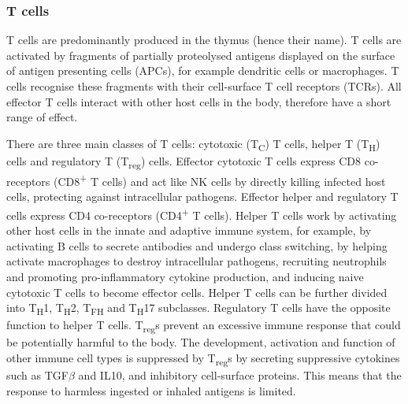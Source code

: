 \subsubsection{T cells}
T cells are predominantly produced in the thymus (hence their name).
T cells are activated by fragments of partially proteolysed antigens displayed on the surface of antigen presenting cells (APCs), for example dendritic cells or macrophages.
T cells recognise these fragments with their cell-surface T cell receptors (TCRs)\@.
All effector T cells interact with other host cells in the body, therefore have a short range of effect.

There are three main classes of T cells: cytotoxic (T\textsubscript{C}) T cells, helper T (T\textsubscript{H}) cells and regulatory T (T\textsubscript{reg}) cells.
Effector cytotoxic T cells express CD8 co-receptors (CD8\textsuperscript{+} T cells) and act like NK cells by directly killing infected host cells, protecting against intracellular pathogens.
Effector helper and regulatory T cells express CD4 co-receptors (CD4\textsuperscript{+} T cells).
Helper T cells work by activating other host cells in the innate and adaptive immune system, for example, by activating B cells to secrete antibodies and undergo class switching, by helping activate macrophages to destroy intracellular pathogens, recruiting neutrophils and promoting pro-inflammatory cytokine production, and inducing naive cytotoxic T cells to become effector cells.
Helper T cells can be further divided into T\textsubscript{H}1, T\textsubscript{H}2, T\textsubscript{FH} and T\textsubscript{H}17 subclasses.
Regulatory T cells have the opposite function to helper T cells.
T\textsubscript{reg}s prevent an excessive immune response that could be potentially harmful to the body.
The development, activation and function of other immune cell types is suppressed by T\textsubscript{reg}s by secreting suppressive cytokines such as TGF$\beta$ and IL10, and inhibitory cell-surface proteins.
This means that the response to harmless ingested or inhaled antigens is limited.

%
